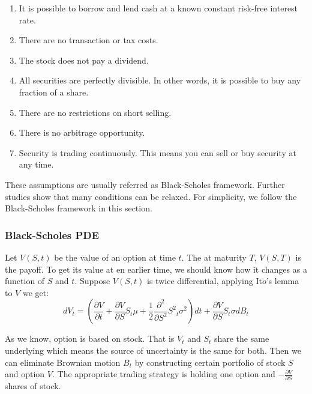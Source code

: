 \documentclass[12pt,oneside,titlepage]{book}
\begin{document}
\begin{enumerate}[1.]
\item It is possible to borrow and lend cash at a known constant risk-free interest rate.
\item There are no transaction or tax costs.
\item The stock does not pay a dividend.
\item All securities are perfectly divisible. In other words, it is possible to buy any fraction of a share.
\item There are no restrictions on short selling.
\item There is no arbitrage opportunity.
\item Security is trading continuously. This means you can sell or buy security at any time.
\end{enumerate}

These assumptions are usually referred as Black-Scholes framework. Further studies show that many conditions can be relaxed. For simplicity, we follow the Black-Scholes framework in this section.


\subsubsection{Black-Scholes PDE}
Let $V(S, t)$ be the value of an option at time $t$. The at maturity $T$, $V(S,T)$ is the payoff. To get its value at en earlier time, we should know how it changes as a function of $S$ and $t$. Suppose $V(S,t)$ is twice differential, applying It$\breve{o}$'s lemma to $V$ we get:
\begin{equation}\label{ito}
dV_t = ( \frac{\partial V}{\partial t} + \frac{\partial V}{\partial S} S_t \mu + \frac{1}{2}\frac{{\partial}^2}{\partial S^2} {S^2}_t {\sigma}^2 ) dt + \frac{\partial V}{\partial S} S_t \sigma d B_t
\end{equation}

As we know, option is based on stock. That is $V_t$ and $S_t$ share the same underlying which means the source of uncertainty is the same for both. Then we can eliminate Brownian motion $B_t$ by constructing certain portfolio of stock $S$ and option $V$. The appropriate trading strategy is holding one option and $ -\frac{\partial V}{\partial S}$ shares of stock.
\end{document}
